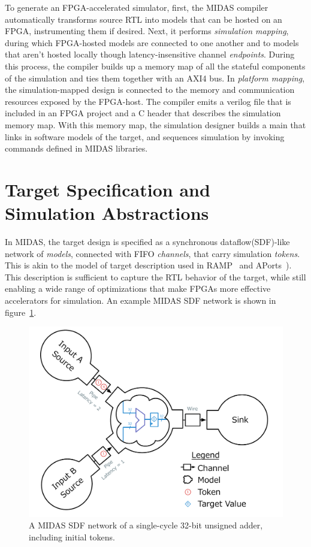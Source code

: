 To generate an FPGA-accelerated simulator, first, the MIDAS compiler
automatically transforms source RTL into models that can be hosted on an FPGA,
instrumenting them if desired. Next, it performs \emph{simulation mapping},
during which FPGA-hosted models are connected to one another and to models
that aren't hosted locally though latency-insensitive channel \emph{endpoints}.
During this process, the compiler builds up a memory map of all the stateful
components of the simulation and ties them together with an AXI4 bus. In
\emph{platform mapping}, the simulation-mapped design is connected to the
memory and communication resources exposed by the FPGA-host. The compiler emits
a verilog file that is included in an FPGA project and a C header that
describes the simulation memory map.  With this memory map, the simulation
designer builds a main that links in software models of the target, and
sequences simulation by invoking commands defined in MIDAS libraries.

\section{Target Specification and Simulation Abstractions}\label{sec:sdf}

In MIDAS, the target design is specified as a synchronous dataflow(SDF)-like
network of \emph{models}, connected with FIFO \emph{channels}, that carry
simulation \emph{tokens}. This is akin to the model of target description used in
RAMP~\cite{ramp} and APorts~\cite{APortNetworks}). This description is sufficient
to capture the RTL behavior of the target, while still enabling a wide range of
optimizations that make FPGAs more effective accelerators for simulation. An
example MIDAS SDF network is shown in figure~\ref{fig:adder-example}.

\begin{figure}
	\centering
	\includegraphics[width=16cm]{figures/adder-example.pdf}
    \caption{A MIDAS SDF network of a single-cycle 32-bit unsigned adder, including initial tokens.}
	\label{fig:adder-example}
\end{figure}

